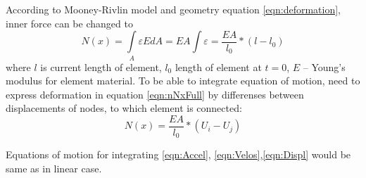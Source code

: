 \documentclass[12pt]{report}
\begin{document}
According to Mooney-Rivlin model and geometry equation \eqref{eqn:deformation}, inner force can be changed to
\begin{equation}\label{eqn:nNxFull}
  N(x)= \int\limits_A \varepsilon EdA=EA\int \varepsilon=\frac{EA}{l_0}*(l-l_0)
\end{equation}
where $l$ is current length of element, $l_0$ length of element at $t=0$, $E$ – Young’s modulus for element material.
To be able to integrate equation of motion, need to express deformation in equation \eqref{eqn:nNxFull} by differenses 
between displacements of nodes, to which element is connected:
\begin{equation}\label{eqn:nNxWdispl}
  N(x)=\frac{EA}{l_0}*(U_{i}-U_{j})
\end{equation}\par
Equations of motion for integrating \eqref{eqn:Accel}, \eqref{eqn:Velos},\eqref{eqn:Displ} would be same as in linear case.
\par
\end{document}
